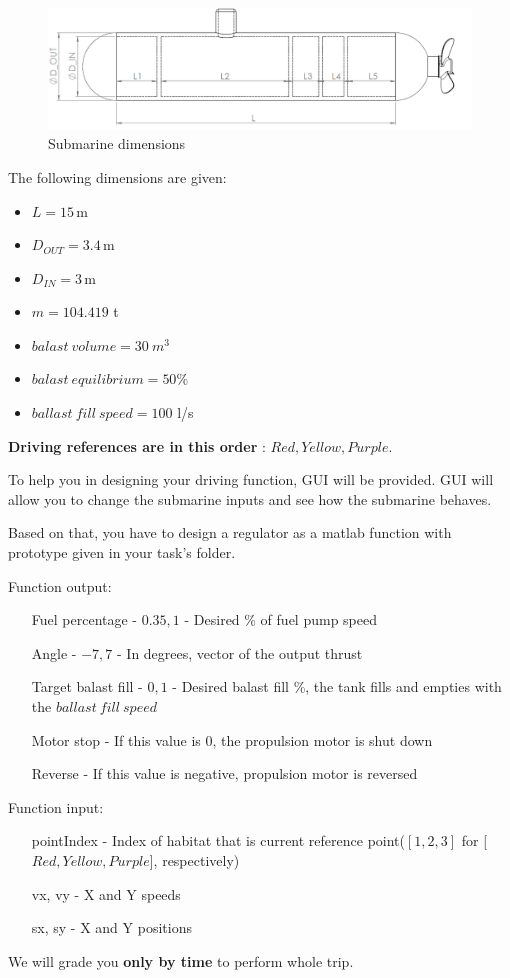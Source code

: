 \documentclass[openany]{book}
\begin{document}
\begin{figure}[h!]
	\centering
	\includegraphics[width=\textwidth]{submarine_side_view.png}
	\caption{Submarine dimensions}
	\label{fig:side_view}
\end{figure}

The following dimensions are given:
\begin{itemize}
	\item $L = 15 \,\textrm{m}$
	\item $D_{OUT} = 3.4 \,\textrm{m}$
	\item $D_{IN} = 3 \,\textrm{m}$
	\item $m = 104.419$ t
	\item $balast\ volume = 30 \ m^3$
	\item $balast\ equilibrium = 50\%$
	\item $ballast\ fill\ speed = 100$ l/s
\end{itemize}


\textbf{Driving references are in this order} : $Red, Yellow, Purple$.


To help you in designing your driving function, GUI will be provided. GUI will allow you to change the submarine inputs and see how the submarine behaves.

Based on that, you have to design a regulator as a matlab function with prototype given in your task's folder.

Function output:

\begin{itemize}
	\item[Fuel percentage] - ${0.35,1}$ - Desired \% of fuel pump speed
	\item[Angle] - ${-7,7}$ - In degrees, vector of the output thrust
	\item[Target balast fill] - ${0,1}$ - Desired balast fill \%, the tank fills and empties with the $ballast\ fill\ speed$
	\item[Motor stop] - If this value is 0, the propulsion motor is shut down
	\item[Reverse] - If this value is negative, propulsion motor is reversed
\end{itemize}

Function input:

\begin{itemize}
	\item[pointIndex] - Index of habitat that is current reference point($[1, 2, 3]$ for [$Red, Yellow, Purple$], respectively)
	\item[vx, vy] - X and Y speeds
	\item[sx, sy] - X and Y positions
\end{itemize}


We will grade you \textbf{only by time} to perform whole trip.
	
	
	
\end{document}
